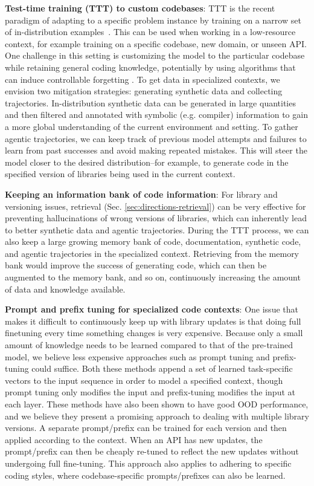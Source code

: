 \textbf{Test-time training (TTT) to custom codebases}: TTT is the recent paradigm of adapting to a specific problem instance by training on a narrow set of in-distribution examples~\citep{akyurek2024surprisingeffectivenesstesttimetraining,sun19ttt}. This can be used when working in a low-resource context, for example training on a specific codebase, new domain, or unseen API. One challenge in this setting is customizing the model to the particular codebase while retaining general coding knowledge, potentially by using algorithms that can induce controllable forgetting \citep{wu2024continual}. To get data in specialized contexts, we envision two mitigation strategies: generating synthetic data and collecting trajectories. In-distribution synthetic data can be generated in large quantities and then filtered and annotated with symbolic (e.g. compiler) information to gain a more global understanding of the current environment and setting. To gather agentic trajectories, we can keep track of previous model attempts and failures to learn from past successes and avoid making repeated mistakes. This will steer the model closer to the desired distribution--for example, to generate code in the specified version of libraries being used in the current context.

\textbf{Keeping an information bank of code information}: For library and versioning issues, retrieval (Sec. \ref{sec:directions-retrieval}) can be very effective for preventing hallucinations of wrong versions of libraries, which can inherently lead to better synthetic data and agentic trajectories. During the TTT process, we can also keep a large growing memory bank of code, documentation, synthetic code, and agentic trajectories in the specialized context. Retrieving from the memory bank would improve the success of generating code, which can then be augmented to the memory bank, and so on, continuously increasing the amount of data and knowledge available.

\textbf{Prompt and prefix tuning for specialized code contexts}: One issue that makes it difficult to continuously keep up with library updates is that doing full finetuning every time something changes is very expensive. Because only a small amount of knowledge needs to be learned compared to that of the pre-trained model, we believe less expensive approaches such as prompt tuning \citep{lester2021power} and prefix-tuning \citep{li2021prefix} could suffice. Both these methods append a set of learned task-specific vectors to the input sequence in order to model a specified context, though prompt tuning only modifies the input and prefix-tuning modifies the input at each layer. These methods have also been shown to have good OOD performance, and we believe they present a promising approach to dealing with multiple library versions. A separate prompt/prefix can be trained for each version and then applied according to the context. When an API has new updates, the prompt/prefix can then be cheaply re-tuned to reflect the new updates without undergoing full fine-tuning. This approach also applies to adhering to specific coding styles, where codebase-specific prompts/prefixes can also be learned.   

